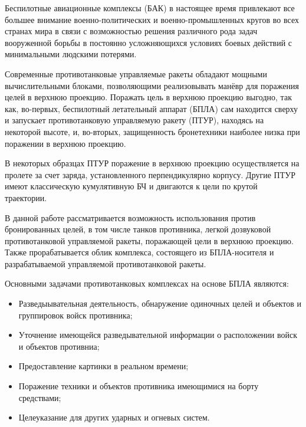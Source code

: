 \Introduction

Беспилотные авиационные комплексы (БАК) в настоящее время привлекают все большее внимание военно-политических и военно-промышленных кругов во всех странах мира в связи с возможностью решения различного рода задач вооруженной борьбы в постоянно усложняющихся условиях боевых действий с минимальными людскими потерями.


Современные противотанковые управляемые ракеты обладают мощными вычислительными блоками, позволяющими реализовывать манёвр для поражения целей в верхнюю проекцию. Поражать цель в верхнюю проекцию выгодно, так как, во-первых, беспилотный летательный аппарат (БПЛА) сам находится сверху и запускает противотанковую управляемую ракету (ПТУР), находясь на некоторой высоте, и, во-вторых, защищенность бронетехники наиболее низка при поражении в верхнюю проекцию.


В некоторых образцах ПТУР поражение в верхнюю проекцию осуществляется на пролете за счет заряда, установленного перпендикулярно корпусу. Другие ПТУР имеют классическую кумулятивную БЧ и двигаются к цели по крутой траектории.


В данной работе рассматривается возможность использования против бронированных целей, в том числе танков противника, легкой дозвуковой противотанковой управляемой ракеты, поражающей цели в верхнюю проекцию. Также прорабатывается облик комплекса, состоящего из БПЛА-носителя и разрабатываемой управляемой противотанковой ракеты.


Основными задачами противотанковых комплексах на основе БПЛА являются:
\begin{itemize}
	\item Разведыывательная деятельность, обнаружение одиночных целей и объектов и группировок войск противника;
	\item Уточнение имеющейся разведывательной информации о расположении войск и объектов противниа;
	\item Предоставление картинки в реальном времени;
	\item Поражение техники и объектов противника имеющимися на борту средствами;
	\item Целеуказание для других ударных и огневых систем.
\end{itemize}

